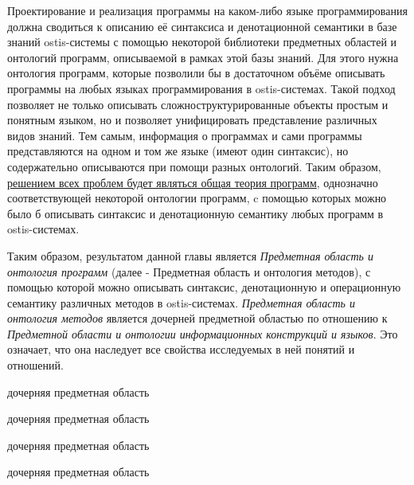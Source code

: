 Проектирование и реализация программы на каком-либо языке программирования должна сводиться к описанию её синтаксиса и денотационной семантики в базе знаний ostis-системы с помощью некоторой библиотеки предметных областей и онтологий программ, описываемой в рамках этой базы знаний. Для этого нужна онтология программ, которые позволили бы в достаточном объёме описывать программы на любых языках программирования в ostis-системах. Такой подход позволяет не только описывать сложноструктурированные объекты простым и понятным языком, но и позволяет унифицировать представление различных видов знаний. Тем самым, информация о программах и сами программы представляются на одном и том же языке (имеют один синтаксис), но содержательно описываются при помощи разных онтологий. Таким образом, \uline{решением всех проблем будет являться общая теория программ}, однозначно соответствующей некоторой онтологии программ, c помощью которых можно было б описывать синтаксис и денотационную семантику любых программ в ostis-системах.

Таким образом, результатом данной главы является \textit{Предметная область и онтология программ} (далее - Предметная область и онтология методов), с помощью которой можно описывать синтаксис, денотационную и операционную семантику различных методов в ostis-системах. \textit{Предметная область и онтология методов} является дочерней предметной областью по отношению к \textit{Предметной области и онтологии информационных конструкций и языков}. Это означает, что она наследует все свойства исследуемых в ней понятий и отношений.

\begin{SCn}
\begin{scnrelfromlist}{дочерняя предметная область}
    \begin{scnindent}
        \begin{scnrelfromlist}{дочерняя предметная область}
        \end{scnrelfromlist}
    \end{scnindent}
\end{scnrelfromlist}
\end{SCn}

\begin{SCn}
\begin{scnrelfromlist}{дочерняя предметная область}
    \begin{scnindent}
        \begin{scnrelfromlist}{дочерняя предметная область}
        \end{scnrelfromlist}
    \end{scnindent}
\end{scnrelfromlist}
\end{SCn}

